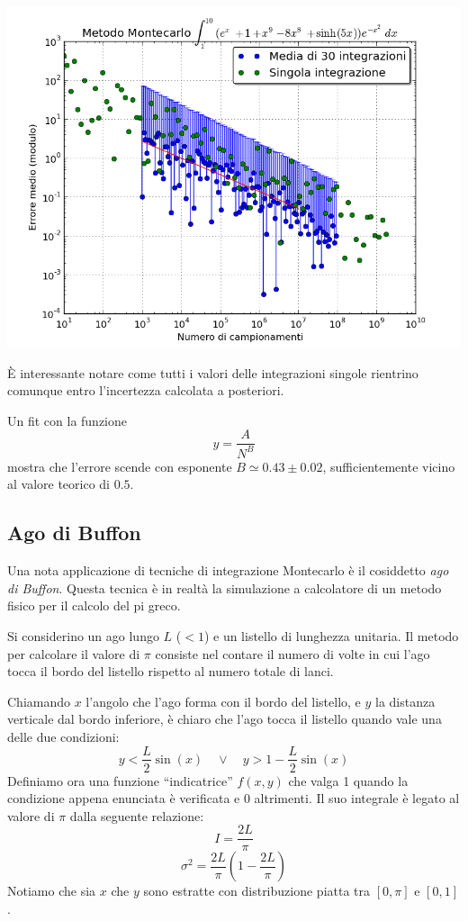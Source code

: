 \documentclass[a4paper,10pt]{article}
\begin{document}
\includegraphics[scale=.5]{../images/montecarlo-comparison.png}

È interessante notare come tutti i valori delle integrazioni singole rientrino comunque entro l'incertezza calcolata a posteriori.

Un fit con la funzione $$y=\frac{A}{N^B}$$ mostra che l'errore scende con esponente $B\simeq 0.43\pm 0.02$, sufficientemente vicino al valore teorico di $0.5$.

\subsection{Ago di Buffon}
Una nota applicazione di tecniche di integrazione Montecarlo è il cosiddetto \emph{ago di Buffon}. Questa tecnica è in realtà la simulazione a calcolatore di un metodo fisico per il calcolo del pi greco.

Si considerino un ago lungo $L$ ($<1$) e un listello di lunghezza unitaria. Il metodo per calcolare il valore di $\pi$ consiste nel contare il numero di volte in cui l'ago tocca il bordo del listello rispetto al numero totale di lanci.

Chiamando $x$ l'angolo che l'ago forma con il bordo del listello, e $y$ la distanza verticale dal bordo inferiore, è chiaro che l'ago tocca il listello quando vale una delle due condizioni:
$$y < \frac{L}{2}\sin(x) \quad\vee\quad y > 1-\frac{L}{2}\sin(x) $$
Definiamo ora una funzione ``indicatrice'' $f(x, y)$ che valga 1 quando la condizione appena enunciata è verificata e 0 altrimenti. Il suo integrale è legato al valore di $\pi$ dalla seguente relazione:
$$I=\frac{2L}{\pi}$$
$$\sigma^2 = \frac{2L}{\pi} (1 - \frac{2L}{\pi})$$
Notiamo che sia $x$ che $y$ sono estratte con distribuzione piatta tra $[0, \pi]$ e $[0,1]$.
\end{document}
